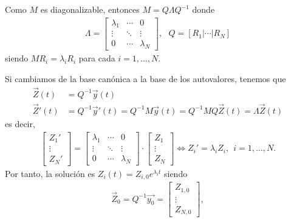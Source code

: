 Como $M$ es diagonalizable, entonces $M = Q\Lambda Q^{-1}$ donde
\begin{align*}
    \Lambda = \begin{bmatrix}
                  \lambda_1 & \cdots & 0         \\
                  \vdots    & \ddots & \vdots    \\
                  0         & \cdots & \lambda_N
              \end{bmatrix}, \ \ \ Q = [R_1 | \cdots | R_N]
\end{align*}
siendo $MR_i = \lambda_iR_i$ para cada $i = 1,\ldots,N$.

Si cambiamos de la base canónica a la base de los autovalores, tenemos que
\begin{align*}
    \overrightarrow{Z}(t)  & = Q^{-1}\overrightarrow{y}(t)                                                                                                 \\
    \overrightarrow{Z}'(t) & = Q^{-1}\overrightarrow{y}'(t) = Q^{-1}M\overrightarrow{y}(t) = Q^{-1}MQ\overrightarrow{Z}(t) = \Lambda \overrightarrow{Z}(t)
\end{align*}
es decir,
\begin{align*}
    \begin{bmatrix}
        Z_1'   \\
        \vdots \\
        Z_N '
    \end{bmatrix} = \begin{bmatrix}
                        \lambda_1 & \cdots & 0         \\
                        \vdots    & \ddots & \vdots    \\
                        0         & \cdots & \lambda_N
                    \end{bmatrix} \cdot \begin{bmatrix}
                                            Z_1    \\
                                            \vdots \\
                                            Z_N
                                        \end{bmatrix} \Longleftrightarrow Z_i' = \lambda _i Z_i, \ \ i = 1,\ldots,N.
\end{align*}
Por tanto, la solución es $Z_i(t) = Z_{i,0}e^{\lambda_i t}$ siendo
\begin{align*}
    \overrightarrow{Z}_0 = Q^{-1}\overrightarrow{y_0} = \begin{bmatrix}
                                                            Z_{1,0} \\
                                                            \vdots  \\
                                                            Z_{N,0}
                                                        \end{bmatrix},
\end{align*}
